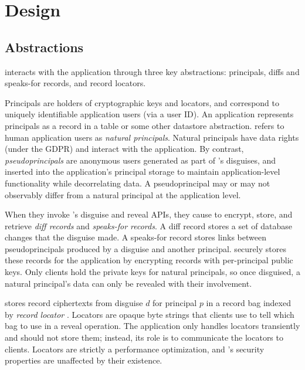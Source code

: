 \section{Design}
\label{s:design}

\subsection{Abstractions}
%
\sys interacts with the application through three key abstractions:
\one{} principals, \two{} diffs and speaks-for records, and
\three{} record locators.
%

%
Principals are holders of cryptographic keys and locators, and correspond to
uniquely identifiable application users (\eg via a user ID).
%
An application represents principals as a record in a  table or some
other datastore abstraction.
%
\sys refers to human application users as \emph{natural principals}.
%
Natural principals have data rights (\eg under the GDPR) and interact with
the application.
%
By contrast, \emph{pseudoprincipals} are anonymous users generated as part of
\sys's disguises, and inserted into the application's principal storage
to maintain application-level functionality while decorrelating data.
%
A pseudoprincipal may or may not observably differ from a natural principal
at the application level.
%

%
When they invoke \sys's disguise and reveal APIs, they cause \sys to encrypt,
store, and retrieve \emph{diff records} and \emph{speaks-for records}.
%
A diff record stores a set of database changes that the disguise made.
%
A speaks-for record stores links between pseudoprincipals produced by a
disguise and another principal.
%
\sys securely stores these records for the application by encrypting records
with per-principal public keys.
%
Only clients hold the private keys for natural principals, so once disguised,
a natural principal's data can only be revealed with their involvement.
%

%
\sys stores record ciphertexts from disguise $d$ for principal $p$ in a record
bag indexed by \emph{record locator }.
%
Locators are opaque byte strings that clients use to tell \sys which bag to
use in a reveal operation.
%
The application only handles locators transiently and should not store them;
instead, its role is to communicate the locators to clients.
%
Locators are strictly a performance optimization, and \sys's security
properties are unaffected by their existence.
%

